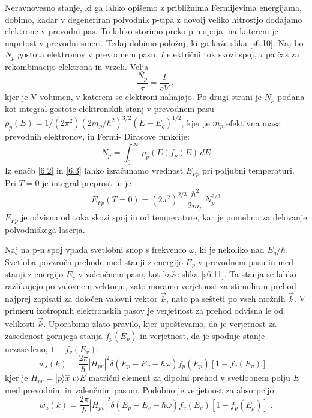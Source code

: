 Neravnovesno stanje, ki ga lahko opišemo z približnima Fermijevima
energijama, dobimo, kadar v degeneriran polvodnik p-tipa z dovolj veliko
hitrostjo dodajamo elektrone v prevodni pas. To lahko storimo preko p-n
spoja, na katerem je napetost v prevodni smeri. Tedaj dobimo položaj, ki ga
kaže slika \ref{s6.10}. Naj bo $N_p$ gostota elektronov v prevodnem pasu, $I
$ električni tok skozi spoj, $\tau$ pa čas za rekombinacijo elektrona in
vrzeli. Velja 
\begin{equation}  \label{6.2}
\frac{N_p}{\tau}=\frac{I}{e V}\;,
\end{equation}
kjer je V volumen, v katerem se elektroni nahajajo. Po drugi strani je $N_p$
podana kot integral gostote elektronskih stanj v prevodnem pasu $%
\rho_p(E)=1/(2\pi^2)(2m_p/\hbar^2)^{3/2}(E-E_g)^{1/2}$, kjer je $m_p$
efektivna masa prevodnih elektronov, in Fermi- Diracove funkcije: 
\begin{equation}  \label{6.3}
N_p=\int_{0}^{\infty}\,\rho_p(E)f_p(E)\,dE
\end{equation}
Iz enačb \ref{6.2} in \ref{6.3} lahko izračunamo vrednost $E_{Fp}$ pri
poljubni temperaturi. Pri $T=0$ je integral preprost in je 
\begin{equation}  \label{6.4}
E_{Fp}(T=0)=(2\pi^2)^{2/3}\frac{\hbar^2}{2m_p}\,N_p^{2/3}
\end{equation}
$E_{Fp}$ je odvisna od toka skozi spoj in od temperature, kar je pomebno za
delovanje polvodniškega laserja.

Naj na p-n spoj vpada svetlobni snop s frekvenco $\omega$, ki je nekoliko
nad $E_g/\hbar$. Svetloba povzroča prehode med stanji z energijo $E_p$ v
prevodnem pasu in med stanji z energijo $E_v$ v valenčnem pasu, kot kaže
slika \ref{s6.11}. Ta stanja se lahko razlikujejo po valovnem vektorju, zato
moramo verjetnost za stimuliran prehod najprej zapisati za določen valovni
vektor $\vec{k}$, nato pa sešteti po vseh možnih $\vec{k}$. V primeru
izotropnih elektronskih pasov je verjetnost za prehod odvisna le od
velikosti $\vec{k}$. Uporabimo zlato pravilo, kjer upoštevamo, da je
verjetnost za zasedenost gornjega stanja $f_p(E_p)$ in verjetnost, da je
spodnje stanje nezasedeno, $1-f_v(E_v)$: 
\begin{equation}  \label{6.5}
w_s(k)=\frac{2\pi}{\hbar}|H_{pv}|^2\delta(E_p-E_v- \hbar\omega)
f_p(E_p)[1-f_v(E_v)]\;,
\end{equation}
kjer je $H_{pv}= |p\rangle \hat{x}|v\rangle E $ matrični element za dipolni
prehod v svetlobnem polju $E$ med prevodnim in valenčnim pasom. Podobno je
verjetnost za absorpcijo 
\begin{equation}  \label{6.6}
w_a(k)=\frac{2\pi}{\hbar}|H_{pv}|^2\delta(E_p-E_v- \hbar\omega)
f_v(E_v)[1-f_p(E_p)]\;.
\end{equation}

